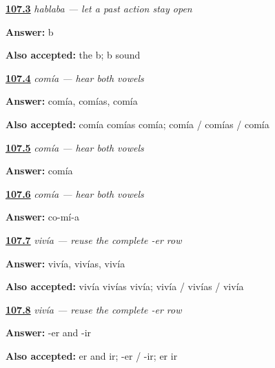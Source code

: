 \noindent\begin{minipage}[t]{\linewidth}
\raggedright
\hyperlink{review-ES-C16-imperfecto-history}{\textbf{107.3}} \emph{hablaba — let a past action stay open}\par
\small \textbf{Answer:} b\par
\footnotesize \textbf{Also accepted:} the b; b sound
\end{minipage}\par\medskip

\noindent\begin{minipage}[t]{\linewidth}
\raggedright
\hyperlink{review-ES-C16-comer-imperfecto-singular-forms}{\textbf{107.4}} \emph{comía — hear both vowels}\par
\small \textbf{Answer:} comía, comías, comía\par
\footnotesize \textbf{Also accepted:} comía comías comía; comía / comías / comía
\end{minipage}\par\medskip

\noindent\begin{minipage}[t]{\linewidth}
\raggedright
\hyperlink{review-ES-C16-comer-imperfecto-comi-comia}{\textbf{107.5}} \emph{comía — hear both vowels}\par
\small \textbf{Answer:} comía\par
\end{minipage}\par\medskip

\noindent\begin{minipage}[t]{\linewidth}
\raggedright
\hyperlink{review-ES-C16-comer-imperfecto-syllables}{\textbf{107.6}} \emph{comía — hear both vowels}\par
\small \textbf{Answer:} co-mí-a\par
\end{minipage}\par\medskip

\noindent\begin{minipage}[t]{\linewidth}
\raggedright
\hyperlink{review-ES-C16-vivir-imperfecto-singular-forms}{\textbf{107.7}} \emph{vivía — reuse the complete -er row}\par
\small \textbf{Answer:} vivía, vivías, vivía\par
\footnotesize \textbf{Also accepted:} vivía vivías vivía; vivía / vivías / vivía
\end{minipage}\par\medskip

\noindent\begin{minipage}[t]{\linewidth}
\raggedright
\hyperlink{review-ES-C16-vivir-imperfecto-shared-row}{\textbf{107.8}} \emph{vivía — reuse the complete -er row}\par
\small \textbf{Answer:} -er and -ir\par
\footnotesize \textbf{Also accepted:} er and ir; -er / -ir; er ir
\end{minipage}\par\medskip

